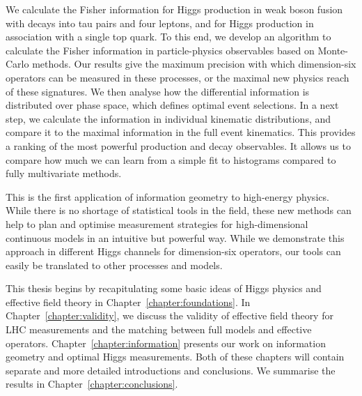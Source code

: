 We calculate the Fisher information for Higgs production in weak boson
fusion with decays into tau pairs and four leptons, and for Higgs
production in association with a single top quark. To this end, we
develop an algorithm to calculate the Fisher information in
particle-physics observables based on Monte-Carlo methods. Our results
give the maximum precision with which dimension-six operators can be
measured in these processes, or the maximal new physics reach of these
signatures. We then analyse how the differential information is
distributed over phase space, which defines optimal event
selections. In a next step, we calculate the information in individual
kinematic distributions, and compare it to the maximal information in
the full event kinematics. This provides a ranking of the most
powerful production and decay observables. It allows us to compare how
much we can learn from a simple fit to histograms compared to fully
multivariate methods.

This is the first application of information geometry to high-energy
physics. While there is no shortage of statistical tools in the field,
these new methods can help to plan and optimise measurement strategies
for high-dimensional continuous models in an intuitive but powerful
way. While we demonstrate this approach in different Higgs channels
for dimension-six operators, our tools can easily be translated to other
processes and models.

\newparagraph
%
This thesis begins by recapitulating some basic ideas of Higgs physics
and effective field theory in Chapter~\ref{chapter:foundations}. In
Chapter~\ref{chapter:validity}, we discuss the validity of effective
field theory for LHC measurements and the matching between full models
and effective operators. Chapter~\ref{chapter:information} presents
our work on information geometry and optimal Higgs measurements. Both
of these chapters will contain separate and more detailed introductions
and conclusions. We summarise the results in
Chapter~\ref{chapter:conclusions}.
